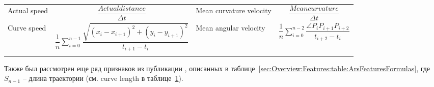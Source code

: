 \documentclass[12pt]{article}
\begin{document}
\begin{table}[h]
\begin{tabular}[c]{ || m{20mm} | c || m{20mm} | c ||}
            \hhline{||-|-||-|-||}
            Actual speed & {\centering $\dfrac{Actualdistance}{\Delta t}$} &
            Mean curvature velocity & {\centering $\dfrac{Meancurvature}{\Delta t}$} \\
            \hhline{||-|-||-|-||}
            Curve speed & {\centering $\dfrac{1}{n} \sum_{i=0}^{n-1} \dfrac{\sqrt{(x_i-x_{i+1})^2 + (y_i-y_{i+1})^2}}{t_{i+1} - t_i}$} &
            Mean angular velocity & {\centering $\dfrac{1}{n} \sum_{i=0}^{n-2} \dfrac{\angle P_i P_{i+1} P_{i+2}}{t_{i+2} - t_i}$} \\
            \hhline{|b:==:b:==:b|} 
        \end{tabular}
        \label{sec:Overview:Features:table:FeaturesFormulas}
    \end{table}

    \par Также был рассмотрен еще ряд признаков из публикации \cite{ArsFeature}, описанных в таблице~\ref{sec:Overview:Features:table:ArsFeaturesFormulas}, где $S_{n-1}$ -- длина траектории (см. curve length в таблице~\ref{sec:Overview:Features:table:FeaturesFormulas}).
\end{document}
